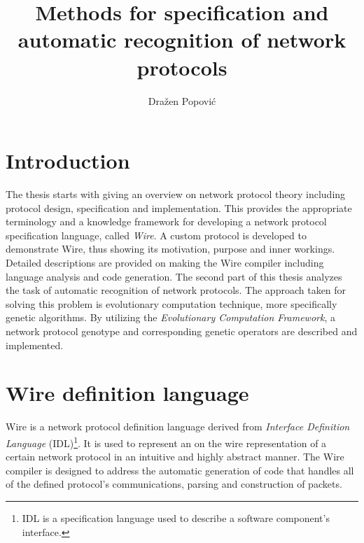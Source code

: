 \documentclass[times, utf8, diplomski]{fer}
\begin{document}

\title{Methods for specification and automatic recognition of network protocols}

\author{Dražen Popović}

\maketitle

\izvornik


\tableofcontents

\chapter{Introduction}
The thesis starts with giving an overview on network protocol theory including
protocol design, specification and implementation. This provides the appropriate
terminology and a knowledge framework for developing a network protocol specification
language, called \emph{Wire}. A custom protocol is developed to demonstrate Wire, thus
showing its motivation, purpose and inner workings. Detailed descriptions are 
provided on making the Wire compiler including language analysis and code generation.
The second part of this thesis analyzes the task of automatic recognition of
network protocols. The approach taken for solving this problem is evolutionary
computation technique, more specifically genetic algorithms. By utilizing the 
\emph{Evolutionary Computation Framework}, a network protocol genotype
and corresponding genetic operators are described and implemented.

\chapter{Wire definition language}
Wire is a network protocol definition language derived from \emph{Interface Definition Language} (IDL)\footnote{IDL is a specification language used to describe a software component's interface.}. 
It is used to represent an on the wire representation of a certain network protocol in an intuitive and highly abstract manner. 
The Wire compiler is designed to address the automatic generation of code that handles all of the defined protocol's communications, parsing and construction of packets. 
\end{document}
